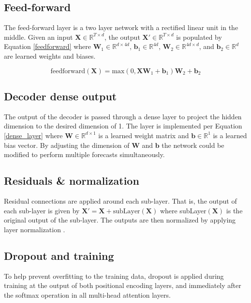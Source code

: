 \subsection{Feed-forward}
The feed-forward layer is a two layer network with a rectified linear unit in the middle.
Given an input $\boldsymbol{X} \in \mathbb{R}^{T \times d}$, the output $\boldsymbol{X'} \in \mathbb{R}^{T \times d}$ is populated by Equation \ref{feedforward} where $\boldsymbol{W}_1 \in \mathbb{R}^{d \times 4d}$, $\boldsymbol{b}_1 \in \mathbb{R}^{4d}$, $\boldsymbol{W}_2 \in \mathbb{R}^{4d \times d}$, and $\boldsymbol{b}_2 \in \mathbb{R}^{d}$ are learned weights and biases.

\begin{equation} \label{feedforward}
\text{feedforward}(\boldsymbol{X}) = \text{max}(0, \boldsymbol{X}  \boldsymbol{W}_1 + \boldsymbol{b}_1)  \boldsymbol{W}_2 + \boldsymbol{b}_2
\end{equation}

\subsection{Decoder dense output}
The output of the decoder is passed through a dense layer to project the hidden dimension to the desired dimension of 1.
The layer is implemented per Equation \ref{dense_layer} where $\boldsymbol{W} \in \mathbb{R}^{d \times 1}$ is a learned weight matrix and $\boldsymbol{b} \in \mathbb{R}^{1}$ is a learned bias vector.
By adjusting the dimension of $\boldsymbol{W}$ and $\boldsymbol{b}$ the network could be modified to perform multiple forecasts simultaneously.


\subsection{Residuals \& normalization}
Residual connections \cite{He2015} are applied around each sub-layer.
That is, the output of each sub-layer is given by $\boldsymbol{X'} = \boldsymbol{X} + \text{subLayer}(\boldsymbol{X})$ where subLayer$(\boldsymbol{X})$ is the original output of the sub-layer.
The outputs are then normalized by applying layer normalization \cite{Ba2016}.

\subsection{Dropout and training}
\label{transformer-dropout-training}
To help prevent overfitting to the training data, dropout \cite{srivastava14a} is applied during training at the output of both positional encoding layers, and immediately after the softmax operation in all multi-head attention layers.

